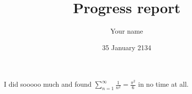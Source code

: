 \documentclass[a4paper,12pt]{article}
\title{Progress report}
\author{Your name}
\date{35 January 2134}
\begin{document}
  \maketitle

  I did sooooo much and found $\sum_{n=1}^{\infty} \tfrac{1}{n^2}=\tfrac{\pi^2}{6}$ in no time at all.
\end{document}
